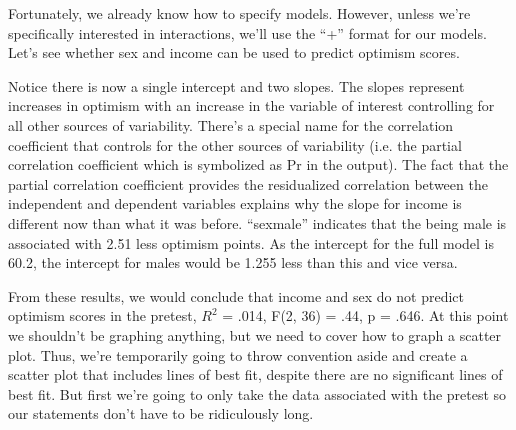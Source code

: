 \documentclass[12pt]{article}
\begin{document}
Fortunately, we already know how to specify models. However, unless we're specifically
interested in interactions, we'll use the ``+'' format for our models. Let's see whether
sex and income can be used to predict optimism scores.

\begin{Schunk}
\end{Schunk}

Notice there is now a single intercept and two slopes. The slopes represent increases
in optimism with an increase in the variable of interest controlling for all other
sources of variability. There's a special name for the correlation coefficient that
controls for the other sources of variability (i.e. the partial correlation
coefficient which is symbolized as Pr in the output). The fact that the partial
correlation coefficient provides the residualized correlation between the independent
and dependent variables explains why the slope for income is different now than
what it was before. ``sexmale'' indicates that the being male is associated with 
2.51 less optimism points. As the intercept for the full model is 60.2, the intercept
for males would be 1.255 less than this and vice versa.

From these results, we would conclude that income and sex do not predict optimism
scores in the pretest, $R^2$ = .014, F(2, 36) = .44, p = .646. At this point we
shouldn't be graphing anything, but we need to cover how to graph a scatter plot.
Thus, we're temporarily going to throw convention aside and create a scatter plot
that includes lines of best fit, despite there are no significant lines of best
fit. But first we're going to only take the data associated with the pretest so
our statements don't have to be ridiculously long.
\end{document}
